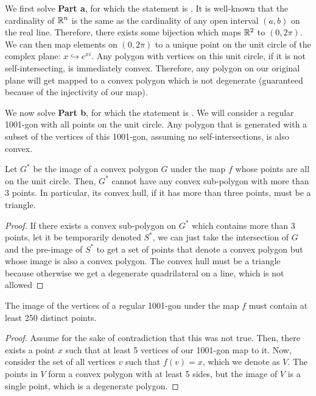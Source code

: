 \documentclass[10pt]{../usamts}
\begin{document}
\begin{solution}

We first solve \textbf{Part a}, for which the statement is . It is well-known that the cardinality of $\mathbb{R}^n$ is the same as the cardinality of any open interval $(a,b)$ on the real line. Therefore, there exists some bijection which maps $\mathbb{R}^2$ to $(0,2\pi)$. We can then map elements on $(0,2\pi)$ to a unique point on the unit circle of the complex plane: $x \hookrightarrow e^{xi}$. Any polygon with vertices on this unit circle, if it is not self-intersecting, is immediately convex. Therefore, any polygon on our original plane will get mapped to a convex polygon which is not degenerate (guaranteed because of the injectivity of our map). 

We now solve \textbf{Part b}, for which the statement is . We will consider a regular 1001-gon with all points on the unit circle. Any polygon that is generated with a subset of the vertices of this 1001-gon, assuming no self-intersections, is also convex.
\begin{claim}
    Let $G^*$ be the image of a convex polygon $G$ under the map $f$ whose points are all on the unit circle. Then, $G^*$ cannot have any convex sub-polygon with more than 3 points. In particular, its convex hull, if it has more than three points, must be a triangle.
\end{claim}
\begin{proof}
    If there exists a convex sub-polygon on $G^*$ which contains more than 3 points, let it be temporarily denoted $S^*$, we can just take the intersection of $G$ and the pre-image of $S^*$ to get a set of points that denote a convex polygon but whose image is also a convex polygon. The convex hull must be a triangle because otherwise we get a degenerate quadrilateral on a line, which is not allowed
\end{proof}

\begin{claim}
    The image of the vertices of a regular 1001-gon under the map $f$ must contain at least 250 distinct points.
\end{claim}
\begin{proof}
    Assume for the sake of contradiction that this was not true. Then, there exists a point $x$ such that at least 5 vertices of our 1001-gon map to it. Now, consider the set of all vertices $v$ such that $f(v) = x$, which we denote as $V$. The points in $V$ form a convex polygon with at least 5 sides, but the image of $V$ is a single point, which is a degenerate polygon.
\end{proof}


\end{solution}
\end{document}
